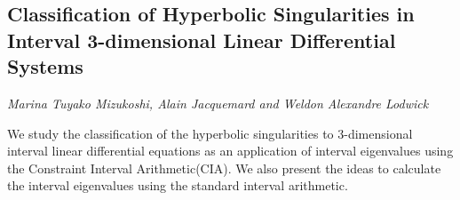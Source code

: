 \documentclass[../booklet.tex]{subfiles}
\begin{document}
\subsection[Classification of Hyperbolic Singularities in Interval 3-dimensional Linear Differential Systems. {\it Marina Tuyako Mizukoshi, Alain Jacquemard and Weldon Alexandre Lodwick}]{Classification of Hyperbolic Singularities in Interval 3-dimensional Linear Differential Systems}
  

\begin{center}
  {\it Marina Tuyako Mizukoshi, Alain Jacquemard and Weldon Alexandre Lodwick}
\end{center}

\vskip 0.8cm


We study the classification of the hyperbolic singularities to 3-dimensional interval linear differential equations as an application of  interval eigenvalues using the Constraint Interval Arithmetic(CIA). We also present the ideas to calculate the interval eigenvalues using the standard interval arithmetic.

\end{document}
